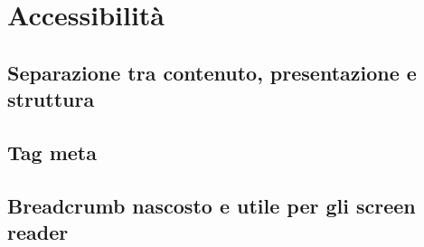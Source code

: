 \section{Accessibilità}
\subsection{Separazione tra contenuto, presentazione e struttura}
\subsection{Tag meta}
\subsection{Breadcrumb nascosto e utile per gli screen reader}


\newpage